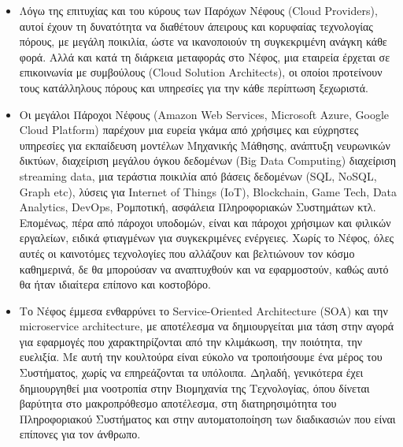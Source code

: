\documentclass{article}
\begin{document}
\begin{itemize}
\item	Λόγω της επιτυχίας και του κύρους των Παρόχων Νέφους (Cloud Providers), αυτοί έχουν τη δυνατότητα να διαθέτουν άπειρους και κορυφαίας τεχνολογίας πόρους, με μεγάλη ποικιλία, ώστε να ικανοποιούν τη συγκεκριμένη ανάγκη κάθε φορά. Αλλά και κατά τη διάρκεια μεταφοράς στο Νέφος, μια εταιρεία έρχεται σε επικοινωνία με συμβούλους (Cloud Solution Architects), οι οποίοι προτείνουν τους κατάλληλους πόρους και υπηρεσίες για την κάθε περίπτωση ξεχωριστά.

\item	Οι μεγάλοι Πάροχοι Νέφους (Amazon Web Services, Microsoft Azure, Google Cloud Platform) παρέχουν μια ευρεία γκάμα από χρήσιμες και εύχρηστες υπηρεσίες για εκπαίδευση μοντέλων Μηχανικής Μάθησης, ανάπτυξη νευρωνικών δικτύων, διαχείριση μεγάλου όγκου δεδομένων (Big Data Computing) διαχείριση streaming data, μια τεράστια ποικιλία από βάσεις δεδομένων (SQL, NoSQL, Graph etc), λύσεις για Internet of Things (IoT), Blockchain, Game Tech, Data Analytics, DevOps, Ρομποτική, ασφάλεια Πληροφοριακών Συστημάτων κτλ. Επομένως, πέρα από πάροχοι υποδομών, είναι και πάροχοι χρήσιμων και φιλικών εργαλείων, ειδικά φτιαγμένων για συγκεκριμένες ενέργειες. Χωρίς το Νέφος, όλες αυτές οι καινοτόμες τεχνολογίες που αλλάζουν και βελτιώνουν τον κόσμο καθημερινά, δε θα μπορούσαν να αναπτυχθούν και να εφαρμοστούν, καθώς αυτό θα ήταν ιδιαίτερα επίπονο και κοστοβόρο.

\item	Το Νέφος έμμεσα ενθαρρύνει το Service-Oriented Architecture (SOA) και την microservice architecture, με αποτέλεσμα να δημιουργείται μια τάση στην αγορά για εφαρμογές που χαρακτηρίζονται από την κλιμάκωση, την ποιότητα, την ευελιξία. Με αυτή την κουλτούρα είναι εύκολο να τροποιήσουμε ένα μέρος του Συστήματος, χωρίς να επηρεάζονται τα υπόλοιπα. Δηλαδή, γενικότερα έχει δημιουργηθεί μια νοοτροπία στην Βιομηχανία της Τεχνολογίας, όπου δίνεται βαρύτητα στο μακροπρόθεσμο αποτέλεσμα, στη διατηρησιμότητα του Πληροφοριακού Συστήματος και στην αυτοματοποίηση των διαδικασιών που είναι επίπονες για τον άνθρωπο.


\end{itemize}
\end{document}
